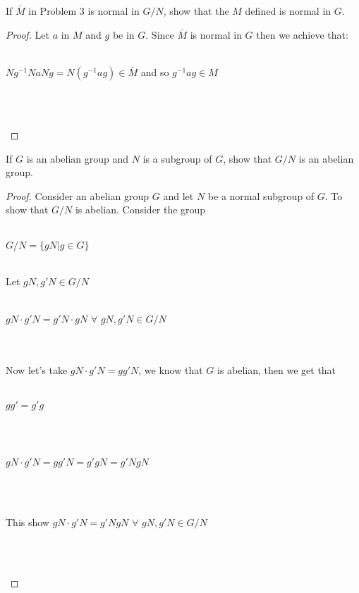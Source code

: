 \documentclass[12pt]{article}
\newenvironment{problem}[2][Problem]{\begin{trivlist}
\item[\hskip \labelsep {\bfseries #1}\hskip \labelsep {\bfseries #2.}]}{\end{trivlist}}
\begin{document}
 \begin{problem}{2.6.4}
If $\bar{M}$ in Problem 3 is normal in $G/N$, show that the $M$ defined is normal in $G$.
\end{problem}

\begin{proof}
Let $a$ in $M$ and $g$ be in $G$. Since $\bar{M}$ is normal in $G$ then we achieve that:  \\ \\
\centerline{$Ng^{-1}NaNg = N(g^{-1}ag) \in \bar{M}$ and so $g^{-1}ag \in M$} \\ \\
\centerline{}
\end{proof}

\begin{problem}{2.6.8}
If $G$ is an abelian group and $N$ is a subgroup of $G$, show that $G/N$ is an abelian group.
\end{problem}

\begin{proof}
Consider an abelian group $G$ and let $N$ be a normal subgroup of $G$. To show that $G/N$ is abelian. Consider the group \\ \\
\centerline{$G/N = \{ gN | g \in G\}$} \\
Let $gN,g'N \in G/N$ \\ \\
\centerline{$gN \cdot g'N = g'N \cdot gN$ $\forall$ $gN,g'N \in G/N$} \\ \\
Now let's take $gN \cdot g'N = gg'N$, we know that $G$ is abelian, then we get that \\ \\
\centerline{$gg'=g'g$} \\ \\
\centerline{$gN \cdot g'N = gg'N = g'gN = g'NgN$} \\ \\
\centerline{This show $gN \cdot g'N = g'NgN$ $\forall$ $gN,g'N \in G/N$}  \\ \\
\centerline{}
\end{proof}





\end{document}
